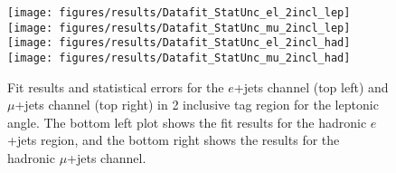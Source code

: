 \begin{figure}[!hb]
\begin{center}

		\texttt{[image: figures/results/Datafit\_StatUnc\_el\_2incl\_lep]}
		\texttt{[image: figures/results/Datafit\_StatUnc\_mu\_2incl\_lep]}\\
		\texttt{[image: figures/results/Datafit\_StatUnc\_el\_2incl\_had]}
		\texttt{[image: figures/results/Datafit\_StatUnc\_mu\_2incl\_had]}
	\caption{Fit results and statistical errors for the $e$+jets channel (top left) and $\mu$+jets channel (top right) in 2 inclusive \bt tag region for the leptonic angle. The bottom left plot shows the fit results for the hadronic $e$+jets region, and the bottom right shows the results for the hadronic $\mu$+jets channel.}
	\label{fig:cosThetaFits_2incl}
\end{center}
\end{figure}

